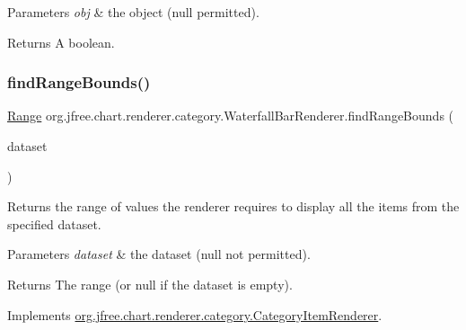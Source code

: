 \begin{DoxyParams}{Parameters}
{\em obj} & the object ({\ttfamily null} permitted).\\
\hline
\end{DoxyParams}
\begin{DoxyReturn}{Returns}
A boolean. 
\end{DoxyReturn}
\mbox{\label{classorg_1_1jfree_1_1chart_1_1renderer_1_1category_1_1_waterfall_bar_renderer_a851bbbf10211f21c9c6f105b5f511baf}} 
\subsubsection{\texorpdfstring{find\+Range\+Bounds()}{findRangeBounds()}}
{\footnotesize\ttfamily \mbox{\hyperlink{classorg_1_1jfree_1_1data_1_1_range}{Range}} org.\+jfree.\+chart.\+renderer.\+category.\+Waterfall\+Bar\+Renderer.\+find\+Range\+Bounds (\begin{DoxyParamCaption}\item[{\mbox{\hyperlink{interfaceorg_1_1jfree_1_1data_1_1category_1_1_category_dataset}{Category\+Dataset}}}]{dataset }\end{DoxyParamCaption})}

Returns the range of values the renderer requires to display all the items from the specified dataset.


\begin{DoxyParams}{Parameters}
{\em dataset} & the dataset ({\ttfamily null} not permitted).\\
\hline
\end{DoxyParams}
\begin{DoxyReturn}{Returns}
The range (or {\ttfamily null} if the dataset is empty). 
\end{DoxyReturn}


Implements \mbox{\hyperlink{interfaceorg_1_1jfree_1_1chart_1_1renderer_1_1category_1_1_category_item_renderer_aa7294c25a26ffd1725d7920a6041a785}{org.\+jfree.\+chart.\+renderer.\+category.\+Category\+Item\+Renderer}}.

